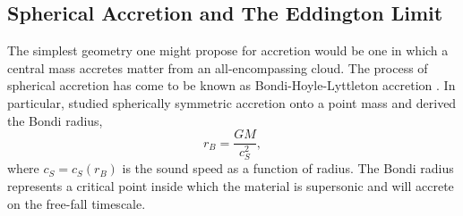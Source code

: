 \subsection{Spherical Accretion and The Eddington Limit}
\label{sec:eddington}

The simplest geometry one might propose for accretion
would be one in which a central mass accretes matter 
from an all-encompassing cloud.
The process of spherical accretion has come to be known as 
Bondi-Hoyle-Lyttleton accretion \citep{hoyle1939,bondi1944}.
In particular, \cite{bondi1952} studied spherically symmetric 
accretion onto a point mass and derived the Bondi radius,
\begin{equation}
r_B = \frac{G M}{c_S^2},
\label{eq:bondi}
\end{equation} 
where $c_S = c_S(r_B)$ is the sound speed as a function of radius.
The Bondi radius represents a critical point inside which the material
is supersonic and will accrete on the free-fall timescale.

